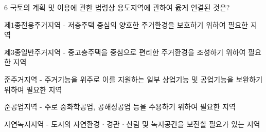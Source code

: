 \begin{question}{6}
국토의 계획 및 이용에 관한 법령상 용도지역에 관하여 옳게 연결된 것은?
\begin{choices}
  \item 제1종전용주거지역 - 저층주택 중심의 양호한 주거환경을 보호하기 위하여 필요한 지역
  \item 제3종일반주거지역 - 중고층주택을 중심으로 편리한 주거환경을 조성하기 위하여 필요한 지역
  \item 준주거지역 - 주거기능을 위주로 이를 지원하는 일부 상업기능 및 공업기능을 보완하기 위하여 필요한 지역
  \item 준공업지역 - 주로 중화학공업, 공해성공업 등을 수용하기 위하여 필요한 지역
  \item 자연녹지지역 - 도시의 자연환경ㆍ경관ㆍ산림 및 녹지공간을 보전할 필요가 있는 지역
\end{choices}
\end{question}
